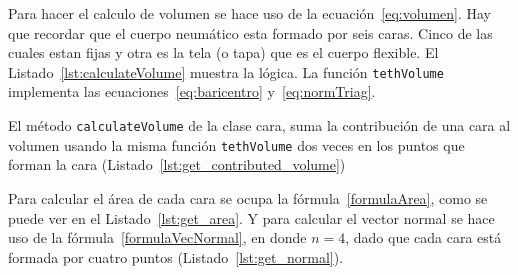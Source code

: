 Para hacer el calculo de volumen se hace uso de la ecuación~\eqref{eq:volumen}.
Hay que recordar que el cuerpo neumático esta formado por seis caras.
Cinco de las cuales estan fijas y otra es la tela (o tapa) que es el cuerpo flexible.
El Listado~\ref{lst:calculateVolume} muestra la lógica. La función \texttt{tethVolume} implementa las ecuaciones~\eqref{eq:baricentro} y~\eqref{eq:normTriag}.


El método \texttt{calculateVolume} de la clase cara, suma la contribución de una cara al volumen usando la misma función \texttt{tethVolume} dos veces en los puntos que forman la cara (Listado~\ref{lst:get_contributed_volume})


Para calcular el área de cada cara se ocupa la fórmula~\eqref{formulaArea}, como se puede ver en el Listado~\ref{lst:get_area}.
Y para calcular el vector normal se hace uso de la fórmula~\eqref{formulaVecNormal}, en donde $n=4$, dado que cada cara está formada por cuatro puntos (Listado~\ref{lst:get_normal}).



